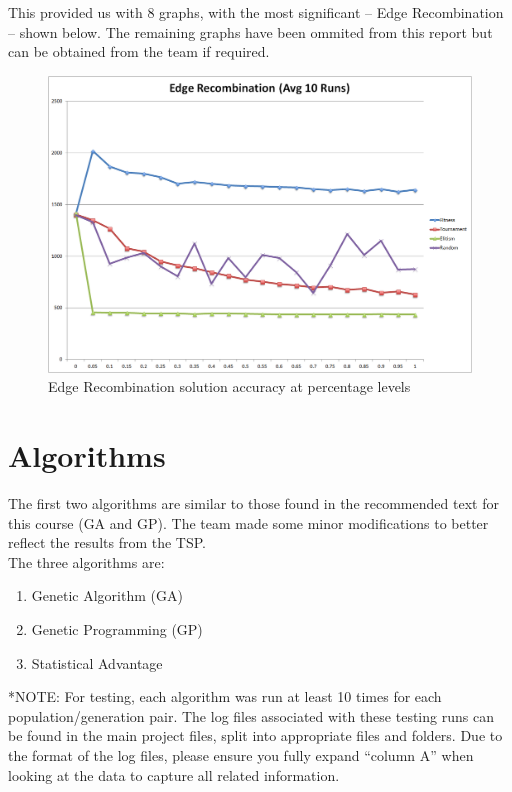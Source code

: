 \documentclass[a4paper,12pt]{article}
\begin{document}
This provided us with 8 graphs, with the most significant – Edge Recombination – shown below. The remaining graphs have been ommited from this report but can be obtained from the team if required.

\begin{figure}[h]
\centering
\includegraphics[width=12.5cm]{Edge.png}
\caption{Edge Recombination solution accuracy at percentage levels}
\end{figure}

\newpage
\section{Algorithms}
The first two algorithms are similar to those found in the recommended text for this course (GA and GP). The team made some minor modifications to better reflect the results from the TSP.\\

The three algorithms are:
\begin{enumerate}
\item Genetic Algorithm (GA)
\item Genetic Programming (GP)
\item Statistical Advantage\\
\end{enumerate}

*NOTE: For testing, each algorithm was run at least 10 times for each population/generation pair. The log files associated with these testing runs can be found in the main project files, split into appropriate files and folders. Due to the format of the log files, please ensure you fully expand ``column A'' when looking at the data to capture all related information. 
\end{document}
